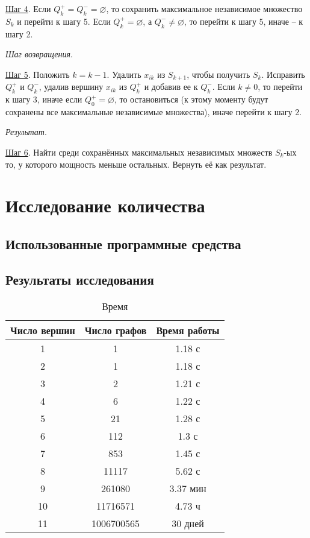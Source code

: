 \documentclass[bachelor, och, nir]{SCWorks}
\begin{document}
\underline{Шаг 4}. Если $Q_k^+ = Q_k^- = \varnothing$, то сохранить максимальное независимое множество $S_k$ и перейти к шагу 5. Если $Q_k^+ = \varnothing$, а $Q_k^- \neq \varnothing $, то перейти к шагу 5, иначе -- к шагу 2.

\textit{Шаг возвращения}.

\underline{Шаг 5}. Положить $k = k - 1$. Удалить $x_{ik}$ из $S_{k+1}$, чтобы получить $S_k$. Исправить $Q_k^+$ и $Q_k^-$, удалив вершину $x_{ik}$ из $Q_k^+$  и добавив ее к $Q_k^-$. Если $k \neq 0$, то перейти к шагу 3, иначе если $Q_0^+ = \varnothing$, то остановиться (к этому моменту будут сохранены все максимальные независимые множества), иначе перейти к шагу 2.

\textit{Результат}.

\underline{Шаг 6}. Найти среди сохранённых максимальных независимых множеств $S_k$-ых то, у которого
мощность меньше остальных. Вернуть её как результат.


\section{Исследование количества}
\subsection{Использованные программные средства}

\subsection{Результаты исследования}
\begin{table}[H]
    \begin{tabular}{|c|c|c|}
    \hline
    Число вершин & Число графов & Время работы \\ \hline
    1  & 1 & 1.18 с \\ \hline
    2  & 1 & 1.18 с \\ \hline
    3  & 2 & 1.21 с \\ \hline
    4  & 6 & 1.22 с \\ \hline
    5  & 21 & 1.28 с\\ \hline
    6  & 112 & 1.3 с \\ \hline
    7  & 853 & 1.45 с \\ \hline
    8  & 11117 & 5.62 с \\ \hline
    9  & 261080 & 3.37 мин \\ \hline
    10 & 11716571 & 4.73 ч \\ \hline
    11 & 1006700565 & 30 дней \\ \hline
    \end{tabular}
    \caption{Время}
\end{table}
\end{document}
